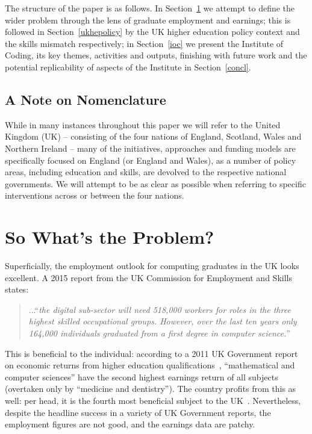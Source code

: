 \documentclass[conference]{IEEEtran}
\begin{document}
The structure of the paper is as follows. In Section~\ref{problem} we
attempt to define the wider problem through the lens of graduate
employment and earnings; this is followed in Section~\ref{ukhepolicy}
by the UK higher education policy context and the skills mismatch
respectively; in Section~\ref{ioc} we present the Institute of Coding,
its key themes, activities and outputs, finishing with future work and the
potential replicability of aspects of the Institute in
Section~\ref{concl}.


\subsection{A Note on Nomenclature}

While in many instances throughout this paper we will refer to the
United Kingdom (UK) -- consisting of the four nations of England,
Scotland, Wales and Northern Ireland -- many of the initiatives,
approaches and funding models are specifically focused on England (or
England and Wales), as a number of policy areas, including education
and skills, are devolved to the respective national governments. We will
attempt to be as clear as possible when referring to specific
interventions across or between the four nations.

\section{So What's the Problem?}\label{problem}

Superficially, the employment outlook for computing graduates in the
UK looks excellent. A 2015 report from the UK Commission for
Employment and Skills~\cite[p.~74]{UKCES2015b} states:

\begin{quote} ...``{\emph{the digital sub-sector will need 518,000 workers for
roles in the three highest skilled occupational groups. However, over
the last ten years only 164,000 individuals graduated from a first
degree in computer science.}}''
\end{quote} 

This is beneficial to the individual: according to a 2011 UK
Government report on economic returns from higher education
qualifications~\cite[Figure 4]{BIS2011a}, ``mathematical and
computer sciences'' have the second highest earnings return of all
subjects (overtaken only by ``medicine and dentistry'').  The country
profits from this as well: per head, it is the fourth most beneficial
subject to the UK~\cite[p.~16]{BIS2011a}. Nevertheless, despite the
headline success in a variety of UK Government reports, the employment
figures are not good, and the earnings data are patchy.
\end{document}
